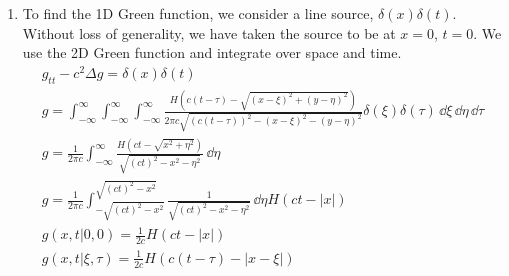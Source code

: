 {\begin{Solution}
\begin{enumerate}
  \item
    To find the 1D Green function, we consider a line source, 
    $\delta(x) \delta(t)$.  Without loss of generality, we have taken the source to 
    be at $x = 0$, $t = 0$.  We use the 2D Green function and integrate over
    space and time.
    \begin{gather*}
      g_{t t} - c^2 \Delta g = \delta(x) \delta(t)
      \\
      g = \int_{-\infty}^\infty \int_{-\infty}^\infty \int_{-\infty}^\infty 
      \frac{ H \left( c(t - \tau) - \sqrt{ (x - \xi)^2 + (y - \eta)^2 } \right) }
      {2 \pi c \sqrt{ (c (t - \tau))^2 - (x - \xi)^2 - (y - \eta)^2 } } \delta(\xi) \delta(\tau) 
      \,\dd \xi \,\dd \eta \,\dd \tau
      \\
      g = \frac{1}{2 \pi c} \int_{-\infty}^\infty
      \frac{ H \left( c t - \sqrt{ x^2 + \eta^2 } \right) }
      {\sqrt{ (c t)^2 - x^2 - \eta^2 } }\, \dd \eta
      \\
      g = \frac{1}{2 \pi c} \int_{- \sqrt{(c t)^2 - x^2}}^{\sqrt{(c t)^2 - x^2}}
      \frac{ 1 }{ \sqrt{ (c t)^2 - x^2 - \eta^2 } }\, \dd \eta
      H \left( c t - |x| \right)
      \\
      g(x,t|0,0) = \frac{1}{2 c} H \left( c t - |x| \right)
      \\
      \boxed{
        g(x,t|\xi,\tau) = \frac{1}{2 c} H \left( c (t - \tau) - |x - \xi| \right)
        }
    \end{gather*}
    
  \end{enumerate}
\end{Solution}







}
